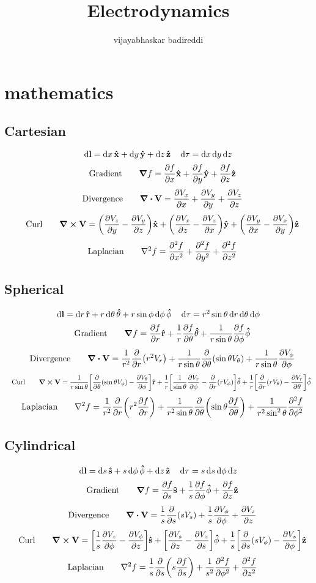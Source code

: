 \documentclass[12pt]{article}
\title{Electrodynamics}
\author{vijayabhaskar badireddi}
\begin{document}

\section*{mathematics}
\subsection*{Cartesian}
\[\dd{\vb{l}}=\dd{x}\vu{\vb{x}}+\dd{y}\vu{\vb{y}}+\dd{z}\vu{\vb{z}}\quad\dd{\tau}=\dd{x}\dd{y}\dd{z}\]
\[\qq{Gradient}\quad\grad{f}=\pdv{f}{x}\vu{\vb{x}}+\pdv{f}{y}\vu{\vb{y}}+\pdv{f}{z}\vu{\vb{z}}\]
\[\qq{Divergence}\quad\div{\vb{V}}=\pdv{V_x}{x}+\pdv{V_y}{y}+\pdv{V_z}{z}\]
\[\qq{Curl}\quad\curl{\vb{V}}=\qty(\pdv{V_z}{y}-\pdv{V_y}{z})\vu{\vb{x}}+\qty(\pdv{V_x}{z}-\pdv{V_z}{x})\vu{\vb{y}}+\qty(\pdv{V_y}{x}-\pdv{V_x}{y})\vu{\vb{z}}\]
\[\qq{Laplacian}\quad\laplacian{f}=\pdv[2]{f}{x}+\pdv[2]{f}{y}+\pdv[2]{f}{z}\]
\subsection*{Spherical}
\[\dd{\vb{l}}=\dd{r}\vu{\vb{r}}+r\dd{\theta}\vu{\vb{\theta}}+r\sin\phi\dd{\phi}\vu{\vb{\phi}}\quad\dd{\tau}=r^2\sin\theta\dd{r}\dd{\theta}\dd{\phi}\]
\[\qq{Gradient}\quad\grad{f}=\pdv{f}{r}\vu{\vb{r}}+\frac{1}{r}\pdv{f}{\theta}\vu{\vb{\theta}}+\frac{1}{r\sin\theta}\pdv{f}{\phi}\vu{\vb{\phi}}\]
\[\qq{Divergence}\quad\div{\vb{V}}=\frac{1}{r^2}\pdv{r}\qty(r^2V_r)+\frac{1}{r\sin\theta}\pdv{\theta}\qty(\sin{\theta}V_{\theta})+\frac{1}{r\sin\theta}\pdv{V_{\phi}}{\phi}\]
\[\qq{Curl}\quad\curl{\vb{V}}=\frac{1}{r\sin\theta}\bqty{\pdv{\theta}\qty(\sin{\theta}V_{\phi})-\pdv{V_{\theta}}{\phi}}\vu{\vb{r}}+\frac{1}{r}\bqty{\frac{1}{\sin\theta}\pdv{V_r}{\phi}-\pdv{r}\qty(rV_{\phi})}\vu{\vb{\theta}}+\frac{1}{r}\bqty{\pdv{r}\qty(rV_{\theta})-\pdv{V_r}{\theta}}\vu{\vb{\phi}}\]
\[\qq{Laplacian}\quad\laplacian{f}=\frac{1}{r^2}\pdv{r}\qty(r^2\pdv{f}{r})+\frac{1}{r^2\sin\theta}\pdv{\theta}\qty(\sin{\theta}\pdv{f}{\theta})+\frac{1}{r^2\sin^2{\theta}}\pdv[2]{f}{\phi}\]
\subsection*{Cylindrical}
\[\dd{\vb{l}}=\dd{s}\vu{\vb{s}}+s\dd{\phi}\vu{\vb{\phi}}+\dd{z}\vu{\vb{z}}\quad\dd{\tau}=s\dd{s}\dd{\phi}\dd{z}\]
\[\qq{Gradient}\quad\grad{f}=\pdv{f}{s}\vu{\vb{s}}+\frac{1}{s}\pdv{f}{\phi}\vu{\vb{\phi}}+\pdv{f}{z}\vu{\vb{z}}\]
\[\qq{Divergence}\quad\div{\vb{V}}=\frac{1}{s}\pdv{s}\qty(sV_s)+\frac{1}{s}\pdv{V_{\phi}}{\phi}+\pdv{V_z}{z}\]
\[\qq{Curl}\quad\curl{\vb{V}}=\bqty{\frac{1}{s}\pdv{V_z}{\phi}-\pdv{V_{\phi}}{z}}\vu{\vb{s}}+\bqty{\pdv{V_s}{z}-\pdv{V_z}{s}}\vu{\vb{\phi}}+\frac{1}{s}\bqty{\pdv{s}\qty(sV_{\phi})-\pdv{V_s}{\phi}}\vu{\vb{z}}\]
\[\qq{Laplacian}\quad\laplacian{f}=\frac{1}{s}\pdv{s}\qty(s\pdv{f}{s})+\frac{1}{s^2}\pdv[2]{f}{\phi}+\pdv[2]{f}{z}\]
\end{document}
